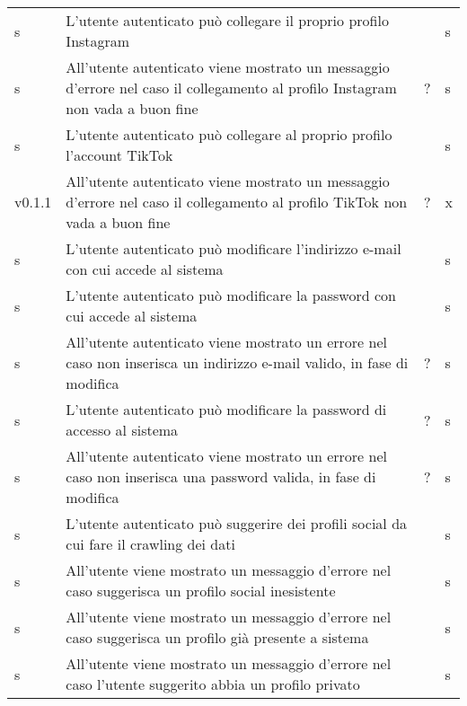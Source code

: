 \begin{longtable}{ m{}<{\centering}  m{}<{\centering}  m{}<{\centering}  m{}<{\centering}}
	 \rowcolor{gray!25} s & L’utente autenticato può collegare il proprio profilo Instagram  & \De & s\\	
	 
	 s & All’utente autenticato viene mostrato un messaggio d’errore nel caso il collegamento al profilo Instagram non vada a buon fine & \De ? & s\\	
	 
	 \rowcolor{gray!25} s & L’utente autenticato può collegare al proprio profilo l’account TikTok & \De & s\\		 

	 v0.1.1 & All’utente autenticato viene mostrato un messaggio d’errore nel caso il collegamento al profilo TikTok non vada a buon fine  & \De ? & x \\	

	 \rowcolor{gray!25} s & L’utente autenticato può modificare l'indirizzo e-mail con cui accede al sistema & \Fa & s\\		
	 
	 s & L’utente autenticato può modificare la password con cui accede al sistema & \Fa & s\\		
	 
	 \rowcolor{gray!25} s & All’utente autenticato viene mostrato un errore nel caso non inserisca un indirizzo e-mail valido, in fase di modifica & \Fa ? & s\\		
	 
	 s & L’utente autenticato può modificare la password di accesso al sistema & \Fa ? & s\\		
	 
	 \rowcolor{gray!25} s & All’utente autenticato viene mostrato un errore nel caso non inserisca una password valida, in fase di modifica  & \Fa ? & s\\			
	  	 	 	
	 s & L’utente autenticato può suggerire dei profili social da cui fare il crawling dei dati & \Ob & s\\		
	 
	 \rowcolor{gray!25} s & All’utente viene mostrato un messaggio d’errore nel caso suggerisca un profilo social inesistente & \De & s\\		
	 
	 s & All’utente viene mostrato un messaggio d’errore nel caso suggerisca un profilo già presente a sistema & \De & s\\		
	 
	 \rowcolor{gray!25} s & All’utente viene mostrato un messaggio d’errore nel caso l’utente suggerito abbia un profilo privato & \De & s\\	
	 

\end{longtable}
